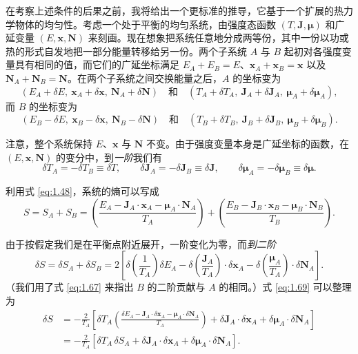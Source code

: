 在考察上述条件的后果之前，我将给出一个更标准的推导，它基于一个扩展的热力学物体的均匀性。考虑一个处于平衡的均匀系统，由强度态函数 $(T,\bm{J},\bm{\mu})$ 和广延变量 $(E,\bm{x},\bm{N})$ 来刻画。现在想象把系统任意地分成两等份，其中一份以功或热的形式自发地把一部分能量转移给另一份。两个子系统 $A$ 与 $B$ 起初对各强度变量具有相同的值，而它们的广延坐标满足 $E_A+E_B=E$、$\bm{x}_A+\bm{x}_B=\bm{x}$ 以及 $\bm{N}_A+\bm{N}_B=\bm{N}$。在两个子系统之间交换能量之后，$A$ 的坐标变为
\begin{equation}
(E_A+\delta E,\ \bm{x}_A+\delta\bm{x},\ \bm{N}_A+\delta\bm{N})\quad\text{和}\quad(T_A+\delta T_A,\ \bm{J}_A+\delta\bm{J}_A,\ \bm{\mu}_A+\delta\bm{\mu}_A),
\label{eq:1.65}
\end{equation}
而 $B$ 的坐标变为
\begin{equation}
(E_B-\delta E,\ \bm{x}_B-\delta\bm{x},\ \bm{N}_B-\delta\bm{N})\quad\text{和}\quad(T_B+\delta T_B,\ \bm{J}_B+\delta\bm{J}_B,\ \bm{\mu}_B+\delta\bm{\mu}_B).
\label{eq:1.66}
\end{equation}


注意，整个系统保持 $E$、$\bm{x}$ 与 $\bm{N}$ 不变。由于强度变量本身是广延坐标的函数，在 $(E,\bm{x},\bm{N})$ 的变分中，到\emph{一阶}我们有
\begin{equation}
\delta T_A=-\delta T_B\equiv\delta T,\qquad\delta\bm{J}_A=-\delta\bm{J}_B\equiv\delta\bm{J},\qquad\delta\bm{\mu}_A=-\delta\bm{\mu}_B\equiv\delta\bm{\mu}.
\label{eq:1.67}
\end{equation}

利用式 \eqref{eq:1.48}，系统的熵可以写成
\begin{equation}
S=S_A+S_B=\left(\frac{E_A-\bm{J}_A\cdot\bm{x}_A-\bm{\mu}_A\cdot\bm{N}_A}{T_A}\right)+\left(\frac{E_B-\bm{J}_B\cdot\bm{x}_B-\bm{\mu}_B\cdot\bm{N}_B}{T_B}\right).
\label{eq:1.68}
\end{equation}

由于按假定我们是在平衡点附近展开，一阶变化为零，而\emph{到二阶}
\begin{equation}
\delta S=\delta S_A+\delta S_B=2\left[\delta\left(\frac{1}{T_A}\right)\delta E_A-\delta\left(\frac{\bm{J}_A}{T_A}\right)\cdot\delta\bm{x}_A-\delta\left(\frac{\bm{\mu}_A}{T_A}\right)\cdot\delta\bm{N}_A\right].
\label{eq:1.69}
\end{equation}
（我们用了式 \eqref{eq:1.67} 来指出 $B$ 的二阶贡献与 $A$ 的相同。）式 \eqref{eq:1.69} 可以整理为
\begin{equation}
\begin{aligned}
\delta S&=-\frac{2}{T_A}\left[\delta T_A\left(\frac{\delta E_A-\bm{J}_A\cdot\delta\bm{x}_A-\bm{\mu}_A\cdot\delta\bm{N}_A}{T_A}\right)+\delta\bm{J}_A\cdot\delta\bm{x}_A+\delta\bm{\mu}_A\cdot\delta\bm{N}_A\right]\\
&=-\frac{2}{T_A}\left[\delta T_A\,\delta S_A+\delta\bm{J}_A\cdot\delta\bm{x}_A+\delta\bm{\mu}_A\cdot\delta\bm{N}_A\right].
\end{aligned}
\label{eq:1.70}
\end{equation}

